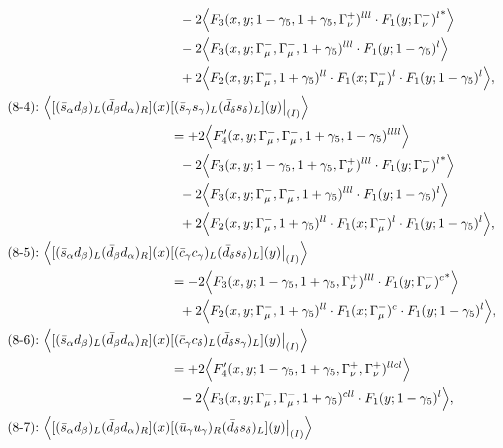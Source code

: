 \begin{align}
\notag\\*&\ \ 
-2\Big\langle F_3(x,y;1-\gamma_5,1+\gamma_5,\Gamma_\nu^+)^{lll} \cdot {F_1(y;\Gamma_\nu^-)^l}^*\Big\rangle
\notag\\*&\ \ 
-2\Big\langle F_3(x,y;\Gamma_\mu^-,\Gamma_\mu^-,1+\gamma_5)^{lll} \cdot F_1(y;1-\gamma_5)^l\Big\rangle
\notag\\*&\ \ 
 + 2\Big\langle F_2(x,y;\Gamma_\mu^-,1+\gamma_5)^{ll} \cdot F_1(x;\Gamma_\mu^-)^l \cdot F_1(y;1-\gamma_5)^l\Big\rangle,
\\
\mbox{(8-4):}\ 
\Big\langle
[(\bar s_\alpha d_\beta)_L(\bar d_\beta d_\alpha)_R](x)&
[(\bar s_\gamma s_\gamma)_L(\bar d_\delta s_\delta)_L](y)\big|_{(I)}
\Big\rangle
\notag\\*
&=
 + 2\Big\langle F_4'(x,y;\Gamma_\mu^-,\Gamma_\mu^-,1+\gamma_5,1-\gamma_5)^{llll}\Big\rangle
\notag\\*&\ \ 
-2\Big\langle F_3(x,y;1-\gamma_5,1+\gamma_5,\Gamma_\nu^+)^{lll} \cdot {F_1(y;\Gamma_\nu^-)^l}^*\Big\rangle
\notag\\*&\ \ 
-2\Big\langle F_3(x,y;\Gamma_\mu^-,\Gamma_\mu^-,1+\gamma_5)^{lll} \cdot F_1(y;1-\gamma_5)^l\Big\rangle
\notag\\*&\ \ 
 + 2\Big\langle F_2(x,y;\Gamma_\mu^-,1+\gamma_5)^{ll} \cdot F_1(x;\Gamma_\mu^-)^l \cdot F_1(y;1-\gamma_5)^l\Big\rangle,
\\
\mbox{(8-5):}\ 
\Big\langle
[(\bar s_\alpha d_\beta)_L(\bar d_\beta d_\alpha)_R](x)&
[(\bar c_\gamma c_\gamma)_L(\bar d_\delta s_\delta)_L](y)\big|_{(I)}
\Big\rangle
\notag\\*
&=
-2\Big\langle F_3(x,y;1-\gamma_5,1+\gamma_5,\Gamma_\nu^+)^{lll} \cdot {F_1(y;\Gamma_\nu^-)^c}^*\Big\rangle
\notag\\*&\ \ 
 + 2\Big\langle F_2(x,y;\Gamma_\mu^-,1+\gamma_5)^{ll} \cdot F_1(x;\Gamma_\mu^-)^c \cdot F_1(y;1-\gamma_5)^l\Big\rangle,
\\
\mbox{(8-6):}\ 
\Big\langle
[(\bar s_\alpha d_\beta)_L(\bar d_\beta d_\alpha)_R](x)&
[(\bar c_\gamma c_\delta)_L(\bar d_\delta s_\gamma)_L](y)\big|_{(I)}
\Big\rangle
\notag\\*
&=
 + 2\Big\langle F_4'(x,y;1-\gamma_5,1+\gamma_5,\Gamma_\nu^+,\Gamma_\nu^+)^{llcl}\Big\rangle
\notag\\*&\ \ 
-2\Big\langle F_3(x,y;\Gamma_\mu^-,\Gamma_\mu^-,1+\gamma_5)^{cll} \cdot F_1(y;1-\gamma_5)^l\Big\rangle,
\\
\mbox{(8-7):}\ 
\Big\langle
[(\bar s_\alpha d_\beta)_L(\bar d_\beta d_\alpha)_R](x)&
[(\bar u_\gamma u_\gamma)_R(\bar d_\delta s_\delta)_L](y)\big|_{(I)}
\Big\rangle

\end{align}
